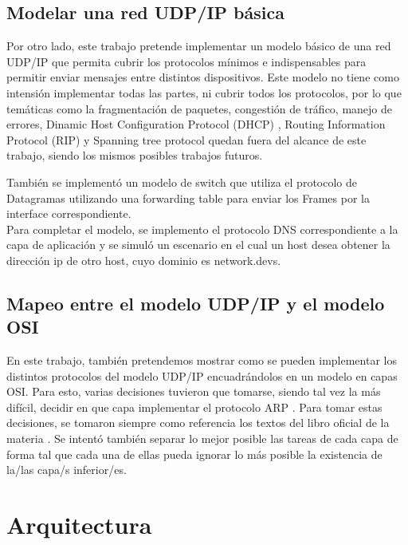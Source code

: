\documentclass[10pt,a4paper]{article}
\begin{document}
\subsection{Modelar una red UDP/IP básica}

Por otro lado, este trabajo pretende implementar un modelo básico de una red UDP/IP que permita cubrir los protocolos mínimos e indispensables para permitir enviar mensajes entre distintos dispositivos. Este modelo no tiene como intensión implementar todas las partes, ni cubrir todos los protocolos, por lo que temáticas como la fragmentación de paquetes, congestión de tráfico, manejo de errores, Dinamic Host Configuration Protocol (DHCP) \cite[p.~231]{peterson2011computer}, Routing Information Protocol (RIP)\cite[p.~243]{peterson2011computer} y Spanning tree protocol \cite[p.~194]{peterson2011computer} quedan fuera del alcance de este trabajo, siendo los mismos posibles trabajos futuros.

También se implementó un modelo de switch que utiliza el protocolo de Datagramas \cite{petersonSwitchDatagram} utilizando una forwarding table para enviar los Frames por la interface correspondiente. \\

Para completar el modelo, se implemento el protocolo DNS correspondiente a la capa de aplicación y se simuló un escenario en el cual un host desea obtener la dirección ip de otro host, cuyo dominio es network.devs.

\subsection{Mapeo entre el modelo UDP/IP y el modelo OSI}

En este trabajo, también pretendemos mostrar como se pueden implementar los distintos protocolos del modelo UDP/IP encuadrándolos en un modelo en capas OSI. Para esto, varias decisiones tuvieron que tomarse, siendo tal vez la más difícil, decidir en que capa implementar el protocolo ARP \cite[p.~228]{peterson2011computer}. Para tomar estas decisiones, se tomaron siempre como referencia los textos del libro oficial de la materia \cite{peterson2011computer}. Se intentó también separar lo mejor posible las tareas de cada capa de forma tal que cada una de ellas pueda ignorar lo más posible la existencia de la/las capa/s inferior/es.

\section{Arquitectura}
\end{document}
